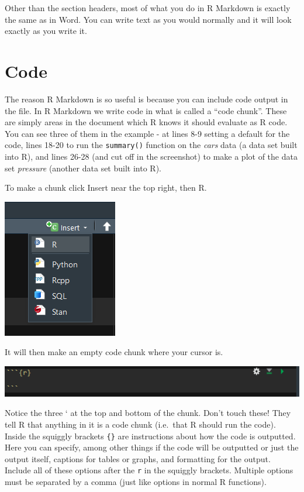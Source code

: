 \documentclass[
  12pt,
  openany]{book}
\begin{document}
Other than the section headers, most of what you do in R Markdown is exactly the same as in Word. You can write text as you would normally and it will look exactly as you write it.

\hypertarget{code-1}{%
\section{Code}\label{code-1}}

The reason R Markdown is so useful is because you can include code output in the file. In R Markdown we write code in what is called a ``code chunk''. These are simply areas in the document which R knows it should evaluate as R code. You can see three of them in the example - at lines 8-9 setting a default for the code, lines 18-20 to run the \texttt{summary()} function on the \emph{cars} data (a data set built into R), and lines 26-28 (and cut off in the screenshot) to make a plot of the data set \emph{pressure} (another data set built into R).

To make a chunk click Insert near the top right, then R.

\includegraphics{images/markdown3.PNG}

It will then make an empty code chunk where your cursor is.

\includegraphics{images/chunk_example.PNG}

Notice the three ` at the top and bottom of the chunk. Don't touch these! They tell R that anything in it is a code chunk (i.e.~that R should run the code). Inside the squiggly brackets \texttt{\{\}} are instructions about how the code is outputted. Here you can specify, among other things if the code will be outputted or just the output itself, captions for tables or graphs, and formatting for the output. Include all of these options after the \texttt{r} in the squiggly brackets. Multiple options must be separated by a comma (just like options in normal R functions).
\end{document}
